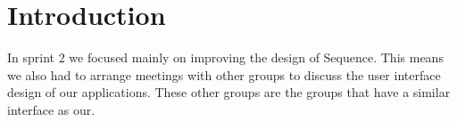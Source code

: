 \section{Introduction}
In sprint 2 we focused mainly on improving the design of Sequence. 
This means we also had to arrange meetings with other groups to discuss the user interface design of our applications. These other groups are the groups that have a similar interface as our.